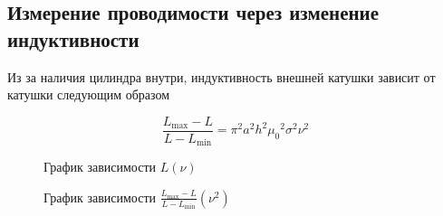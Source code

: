 \documentclass{article}
\begin{document}
\subsection{Измерение проводимости через изменение индуктивности}

Из за наличия цилиндра внутри, индуктивность внешней катушки зависит от катушки
следующим образом

\begin{equation*}
    \frac{L_{\max} - L}{L - L_{\min}} = \pi ^2 a^2 h^2 {\mu_0}^2 \sigma^2 \nu^2
\end{equation*}

\begin{figure}[h]
    \caption{График зависимости $L(\nu)$}\label{fig:L_nu}
    \newpage
\end{figure}

\newpage

\begin{figure}[h]
    \caption{График зависимости $\frac{L_{\max} - L}{L - L_{\min}} (\nu^2)$}\label{fig:L_nu_linearized}
    \newpage
\end{figure}
\end{document}

